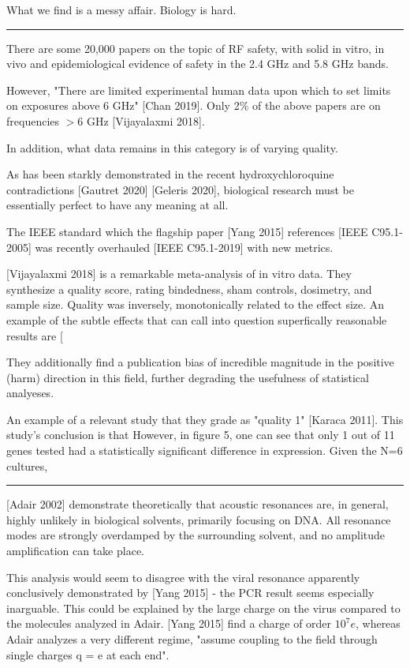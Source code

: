 \documentclass[fleqn,10pt]{article}
\begin{document}
\begin{multicols}{1}
What we find is a messy affair. Biology is hard.

\rule{\linewidth}{0.2pt}

There are some 20,000 papers on the topic of RF safety, with solid in vitro, in vivo and epidemiological evidence of safety in the 2.4 GHz and 5.8 GHz bands.

However, "There are limited experimental human data upon which to set limits on exposures above 6 GHz" [Chan 2019]. Only 2\% of the above papers are on frequencies $>6$ GHz [Vijayalaxmi 2018]. 

In addition, what data remains in this category is of varying quality. 

As has been starkly demonstrated in the recent hydroxychloroquine contradictions [Gautret 2020] [Geleris 2020], biological research must be essentially perfect to have any meaning at all.


The IEEE standard which the flagship paper [Yang 2015] references [IEEE C95.1-2005] was recently overhauled [IEEE C95.1-2019] with new metrics.


[Vijayalaxmi 2018] is a remarkable meta-analysis of in vitro data. They synthesize a quality score, rating bindedness, sham controls, dosimetry, and sample size. Quality was inversely, monotonically related to the effect size. An example of the subtle effects that can call into question superfically reasonable results are [

They additionally find a publication bias of incredible magnitude in the positive (harm) direction in this field, further degrading the usefulness of statistical analyeses.

An example of a relevant study that they grade as "quality 1" [Karaca 2011]. This study's conclusion is that However, in figure 5, one can see that only 1 out of 11 genes tested had a statistically significant difference in expression. Given the N=6 cultures, 

\rule{\linewidth}{0.2pt}

[Adair 2002] demonstrate theoretically that acoustic resonances are, in general, highly unlikely in biological solvents, primarily focusing on DNA. All resonance modes are strongly overdamped by the surrounding solvent, and no amplitude amplification can take place.

This analysis would seem to disagree with the viral resonance apparently conclusively demonstrated by [Yang 2015] - the PCR result seems especially inarguable. This could be explained by the large charge on the virus compared to the molecules analyzed in Adair. [Yang 2015] find a charge of order $10^7 e$, whereas Adair analyzes a very different regime, "assume coupling to the field through single charges q = e at each end".


\end{multicols}
\end{document}
